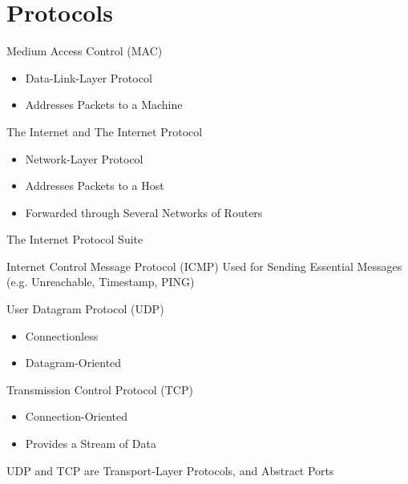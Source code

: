 \documentclass{beamer}
\begin{document}
\section{Protocols}

    \begin{frame}{Medium Access Control (MAC)}
        \begin{itemize}
            \item Data-Link-Layer Protocol
            \item Addresses Packets to a Machine
        \end{itemize}
    \end{frame}

    \begin{frame}{The Internet and The Internet Protocol}
        \begin{itemize}
            \item Network-Layer Protocol
            \item Addresses Packets to a Host
            \item Forwarded through Several Networks of Routers
        \end{itemize}
    \end{frame}

    \begin{frame}{The Internet Protocol Suite}
        \begin{block}{Internet Control Message Protocol (ICMP)}
            Used for Sending Essential Messages (e.g. Unreachable, Timestamp, PING)
        \end{block}

        \begin{block}{User Datagram Protocol (UDP)}
            \begin{itemize}
                \item Connectionless
                \item Datagram-Oriented
            \end{itemize}
        \end{block}

        \begin{block}{Transmission Control Protocol (TCP)}
            \begin{itemize}
                \item Connection-Oriented
                \item Provides a Stream of Data
            \end{itemize}
        \end{block}

        UDP and TCP are Transport-Layer Protocols, and Abstract Ports
    \end{frame}
\end{document}
